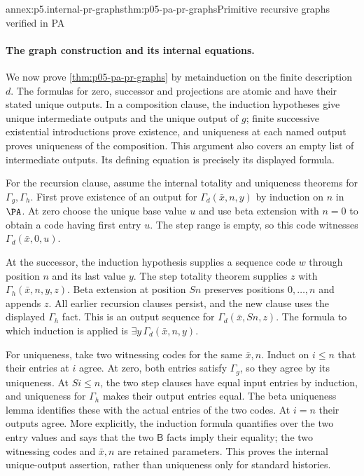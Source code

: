 \begin{annexitem}{annex:p5.internal-pr-graphs}{thm:p05-pa-pr-graphs}{Primitive recursive graphs verified in PA}
\paragraph{The graph construction and its internal equations.}
We now prove \cref{thm:p05-pa-pr-graphs} by metainduction on the finite
description \(d\).  The formulas for zero, successor and projections are
atomic and have their stated unique outputs.  In a composition clause,
the induction hypotheses give unique intermediate outputs and the unique
output of \(g\); finite successive existential introductions prove
existence, and uniqueness at each named output proves uniqueness of the
composition.  This argument also covers an empty list of intermediate
outputs.  Its defining equation is precisely its displayed formula.

For the recursion clause, assume the internal totality and uniqueness
theorems for \(\Gamma_g,\Gamma_h\).  First prove existence of an output
for \(\Gamma_d(\bar x,n,y)\) by induction on \(n\) in \(\PA\).
At zero choose the unique base value \(u\) and use beta extension with
\(n=0\) to obtain a code having first entry \(u\).  The step range is
empty, so this code witnesses \(\Gamma_d(\bar x,0,u)\).

At the successor, the induction hypothesis supplies a sequence code \(w\)
through position \(n\) and its last value \(y\).  The step totality
theorem supplies \(z\) with \(\Gamma_h(\bar x,n,y,z)\).
Beta extension at position \(Sn\) preserves positions \(0,\ldots,n\)
and appends \(z\).  All earlier recursion clauses persist, and the new
clause uses the displayed \(\Gamma_h\) fact.  This is an output sequence
for \(\Gamma_d(\bar x,Sn,z)\).  The formula to which induction is
applied is \(\exists y\,\Gamma_d(\bar x,n,y)\).

For uniqueness, take two witnessing codes for the same \(\bar x,n\).
Induct on \(i\leq n\) that their entries at \(i\) agree.  At zero,
both entries satisfy \(\Gamma_g\), so they agree by its uniqueness.
At \(Si\leq n\), the two step clauses have equal input entries by
induction, and uniqueness for \(\Gamma_h\) makes their output entries
equal.  The beta uniqueness lemma identifies these with the actual entries
of the two codes.  At \(i=n\) their outputs agree.  More explicitly,
the induction formula quantifies over the two entry values and says that
the two \(\mathsf B\) facts imply their equality; the two witnessing
codes and \(\bar x,n\) are retained parameters.  This proves the internal
unique-output assertion, rather than uniqueness only for standard histories.


\end{annexitem}
